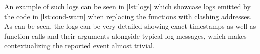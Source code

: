 An example of such logs can be seen in \autoref{lst:logs} which showcase logs emitted by the code in \autoref{lst:cond-warn} when replacing the functions with clashing addresses.
As can be seen, the logs can be very detailed showing exact timestamps as well as function calls and their arguments alongside typical log messages, which makes contextualizing the reported event almost trivial.